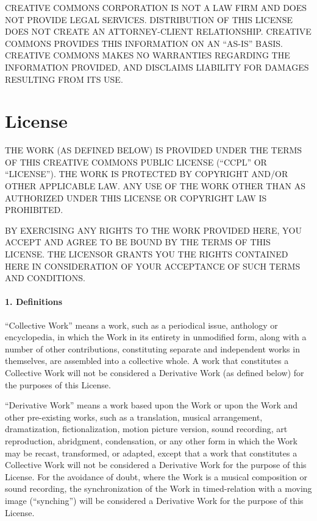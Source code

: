 
CREATIVE COMMONS CORPORATION IS NOT A LAW FIRM AND DOES NOT PROVIDE
LEGAL SERVICES. DISTRIBUTION OF THIS LICENSE DOES NOT CREATE AN
ATTORNEY-CLIENT RELATIONSHIP. CREATIVE COMMONS PROVIDES THIS
INFORMATION ON AN ``AS-IS'' BASIS. CREATIVE COMMONS MAKES NO WARRANTIES
REGARDING THE INFORMATION PROVIDED, AND DISCLAIMS LIABILITY FOR
DAMAGES RESULTING FROM ITS USE.

\section*{License}

THE WORK (AS DEFINED BELOW) IS PROVIDED UNDER THE TERMS OF THIS CREATIVE COMMONS PUBLIC LICENSE (``CCPL'' OR ``LICENSE''). THE WORK IS PROTECTED BY COPYRIGHT AND/OR OTHER APPLICABLE LAW. ANY USE OF THE WORK OTHER THAN AS AUTHORIZED UNDER THIS LICENSE OR COPYRIGHT LAW IS PROHIBITED.

BY EXERCISING ANY RIGHTS TO THE WORK PROVIDED HERE, YOU ACCEPT AND AGREE TO BE BOUND BY THE TERMS OF THIS LICENSE. THE LICENSOR GRANTS YOU THE RIGHTS CONTAINED HERE IN CONSIDERATION OF YOUR ACCEPTANCE OF SUCH TERMS AND CONDITIONS.

\paragraph{1. Definitions}

``Collective Work'' means a work, such as a periodical issue, anthology or encyclopedia, in which the Work in its entirety in unmodified form, along with a number of other contributions, constituting separate and independent works in themselves, are assembled into a collective whole. A work that constitutes a Collective Work will not be considered a Derivative Work (as defined below) for the purposes of this License.

``Derivative Work'' means a work based upon the Work or upon the Work and other pre-existing works, such as a translation, musical arrangement, dramatization, fictionalization, motion picture version, sound recording, art reproduction, abridgment, condensation, or any other form in which the Work may be recast, transformed, or adapted, except that a work that constitutes a Collective Work will not be considered a Derivative Work for the purpose of this License. For the avoidance of doubt, where the Work is a musical composition or sound recording, the synchronization of the Work in timed-relation with a moving image (``synching'') will be considered a Derivative Work for the purpose of this License.

